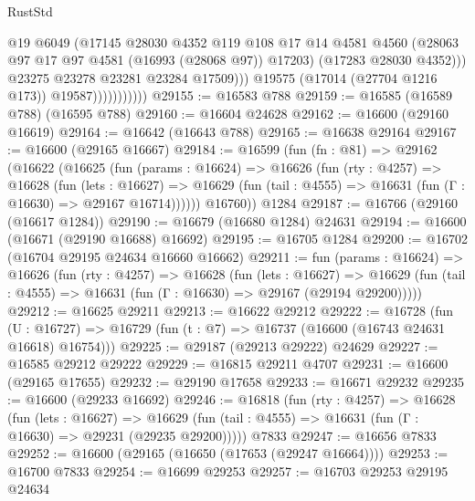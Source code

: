 \begin{lexlean}{RustStd}
\begin{coremodule}
{\begin{coremodule}
{{{{{{{{{{{{{{{{{{{{{{{{{{{{{{{{{{{{{{{{{{{{{{{{{{{{{{{                                  @19
                                  @6049
                                  (@17145
                                    @28030
                                    @4352
                                    @119
                                    @108
                                    @17
                                    @14
                                    @4581
                                    @4560
                                    (@28063 @97 @17 @97 @4581 (@16993 (@28068 @97)) @17203)
                                    (@17283 @28030 @4352)))
                                @23275
                                @23278
                                @23281
                                @23284
                                @17509)))
                          @19575
                          (@17014 (@27704 @1216 @173))
                          @19587)))))))))))
@29155 := @16583 @788
@29159 := @16585 (@16589 @788) (@16595 @788)
@29160 := @16604 @24628
@29162 := @16600 (@29160 @16619)
@29164 := @16642 (@16643 @788)
@29165 := @16638 @29164
@29167 := @16600 (@29165 @16667)
@29184 := @16599
    (fun (fn : @81) =>
    @29162
      (@16622
        (@16625
          (fun (params : @16624) =>
          @16626
            (fun (rty : @4257) =>
            @16628
              (fun (lets : @16627) =>
              @16629 (fun (tail : @4555) => @16631 (fun (Γ : @16630) => @29167 @16714))))))
        @16760))
    @1284
@29187 := @16766 (@29160 (@16617 @1284))
@29190 := @16679 (@16680 @1284) @24631
@29194 := @16600 (@16671 (@29190 @16688) @16692)
@29195 := @16705 @1284
@29200 := @16702 (@16704 @29195 @24634 @16660 @16662)
@29211 := fun (params : @16624) =>
  @16626
    (fun (rty : @4257) =>
    @16628
      (fun (lets : @16627) =>
      @16629 (fun (tail : @4555) => @16631 (fun (Γ : @16630) => @29167 (@29194 @29200)))))
@29212 := @16625 @29211
@29213 := @16622 @29212
@29222 := @16728
    (fun (U : @16727) => @16729 (fun (t : @7) => @16737 (@16600 (@16743 @24631 @16618) @16754)))
@29225 := @29187 (@29213 @29222) @24629
@29227 := @16585 @29212 @29222
@29229 := @16815 @29211 @4707
@29231 := @16600 (@29165 @17655)
@29232 := @29190 @17658
@29233 := @16671 @29232
@29235 := @16600 (@29233 @16692)
@29246 := @16818
    (fun (rty : @4257) =>
    @16628
      (fun (lets : @16627) =>
      @16629 (fun (tail : @4555) => @16631 (fun (Γ : @16630) => @29231 (@29235 @29200)))))
    @7833
@29247 := @16656 @7833
@29252 := @16600 (@29165 (@16650 (@17653 (@29247 @16664))))
@29253 := @16700 @7833
@29254 := @16699 @29253
@29257 := @16703 @29253 @29195 @24634
}}}}}}}}}}}}}}}}}}}}}}}}}}}}}}}}}}}}}}}}}}}}}}}}}}}}}}}
\end{coremodule}}
\end{coremodule}
\end{lexlean}
